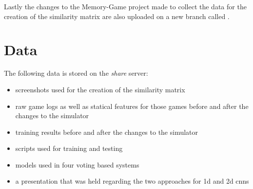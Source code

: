 Lastly the changes to the Memory-Game project made to collect the data for the creation of the similarity matrix are also uploaded on a new branch called .

\newpage

\section{Data}
The following data is stored on the \textit{share} server:
\begin{itemize}
	\item screenshots used for the creation of the similarity matrix
	\item raw game logs as well as statical features for those games before and after the changes to the simulator
	\item training results before and after the changes to the simulator 
	\item scripts used for training and testing
	\item models used in four voting based systems 
	\item a presentation that was held regarding the two approaches for 1d and 2d cnns
\end{itemize}
 





 





